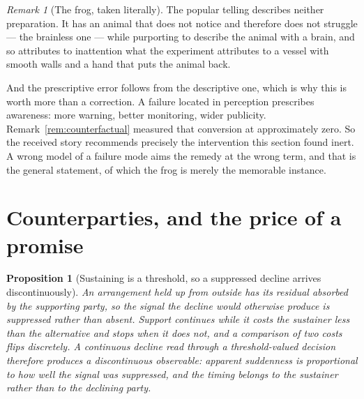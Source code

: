 \documentclass[11pt,a4paper]{article}
\newtheorem{proposition}[definition]{Proposition}
\theoremstyle{remark}
\newtheorem{remark}[definition]{Remark}
\begin{document}
\begin{remark}[The frog, taken literally]
The popular telling describes neither preparation. It has an animal that does not notice and therefore
does not struggle --- the brainless one --- while purporting to describe the animal with a brain, and so
attributes to inattention what the experiment attributes to a vessel with smooth walls and a hand that
puts the animal back.

And the prescriptive error follows from the descriptive one, which is why this is worth more than a
correction. A failure located in perception prescribes awareness: more warning, better monitoring, wider
publicity. Remark~\ref{rem:counterfactual} measured that conversion at approximately zero. So the
received story recommends precisely the intervention this section found inert. A wrong model of a
failure mode aims the remedy at the wrong term, and that is the general statement, of which the frog is
merely the memorable instance.
\end{remark}

\section{Counterparties, and the price of a promise}\label{sec:counterparties}
\begin{proposition}[Sustaining is a threshold, so a suppressed decline arrives discontinuously]\label{prop:sustaining-threshold}
An arrangement held up from outside has its residual absorbed by the supporting party, so the signal the
decline would otherwise produce is suppressed rather than absent. Support continues while it costs the
sustainer less than the alternative and stops when it does not, and a comparison of two costs flips
discretely. A continuous decline read through a threshold-valued decision therefore produces a
discontinuous observable: apparent suddenness is proportional to how well the signal was suppressed, and
the timing belongs to the sustainer rather than to the declining party.
\end{proposition}
\end{document}
